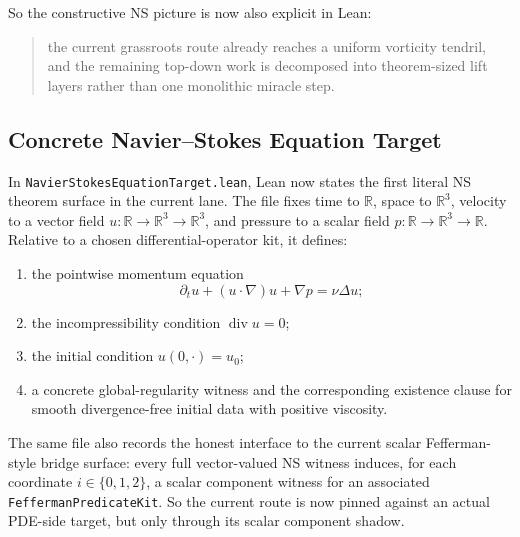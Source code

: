 \documentclass[11pt]{article}
\begin{document}
So the constructive NS picture is now also explicit in Lean:
\begin{quote}
the current grassroots route already reaches a uniform vorticity tendril, and
the remaining top-down work is decomposed into theorem-sized lift layers rather
than one monolithic miracle step.
\end{quote}

\subsection{Concrete Navier--Stokes Equation Target}

In \texttt{NavierStokesEquationTarget.lean}, Lean now states the first literal
NS theorem surface in the current lane.  The file fixes time to \(\mathbb{R}\),
space to \(\mathbb{R}^3\), velocity to a vector field
\(u : \mathbb{R} \to \mathbb{R}^3 \to \mathbb{R}^3\), and pressure to a scalar
field \(p : \mathbb{R} \to \mathbb{R}^3 \to \mathbb{R}\).  Relative to a chosen
differential-operator kit, it defines:
\begin{enumerate}[leftmargin=1.5em]
  \item the pointwise momentum equation
  \[
  \partial_t u + (u \cdot \nabla)u + \nabla p = \nu \Delta u;
  \]
  \item the incompressibility condition \(\operatorname{div} u = 0\);
  \item the initial condition \(u(0,\cdot)=u_0\);
  \item a concrete global-regularity witness and the corresponding existence
  clause for smooth divergence-free initial data with positive viscosity.
\end{enumerate}

The same file also records the honest interface to the current scalar
Fefferman-style bridge surface: every full vector-valued NS witness induces,
for each coordinate \(i \in \{0,1,2\}\), a scalar component witness for an
associated \texttt{FeffermanPredicateKit}.  So the current route is now pinned
against an actual PDE-side target, but only through its scalar component
shadow.
\end{document}
